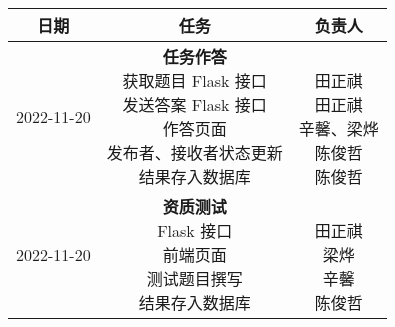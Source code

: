 \begin{table}[h!]
    \centering
    \begin{tabular}{ccc}\toprule
        \textbf{日期} & \textbf{任务} & \textbf{负责人} \\\midrule
        2022-11-20 & \makecell[l]{\textbf{任务作答} \\
            获取题目 Flask 接口 \\
            发送答案 Flask 接口 \\
            作答页面 \\
            发布者、接收者状态更新 \\
            结果存入数据库 \\
        } & \makecell{ \\
            田正祺 \\
            田正祺 \\
            辛馨、梁烨 \\
            陈俊哲 \\
            陈俊哲 \\
        } \\\midrule
        2022-11-20 & \makecell[l]{\textbf{资质测试} \\
            Flask 接口 \\
            前端页面 \\
            测试题目撰写 \\
            结果存入数据库 \\
        } & \makecell{ \\
            田正祺 \\
            梁烨 \\
            辛馨 \\
            陈俊哲 \\
        } \\
        \bottomrule
    \end{tabular}
\end{table}


\iffalse

2022-11-06 & \makecell[l]{\textbf{a} \\
a
} & \makecell{ \\
a
} \\\midrule

\fi